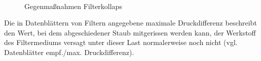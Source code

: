     \begin{figure}[H]
        \begin{center}
           \\ %
    
       \end{center}
       \caption{%
           Gegenmaßnahmen Filterkollaps
        }%
      \label{fig:subfigures}
    \end{figure}
    Die in Datenblättern von Filtern angegebene maximale Druckdifferenz beschreibt den Wert, bei dem abgeschiedener Staub mitgerissen werden kann, der Werkstoff des Filtermediums versagt unter dieser Last normalerweise noch nicht (vgl. Datenblätter empf./max. Druckdifferenz).
